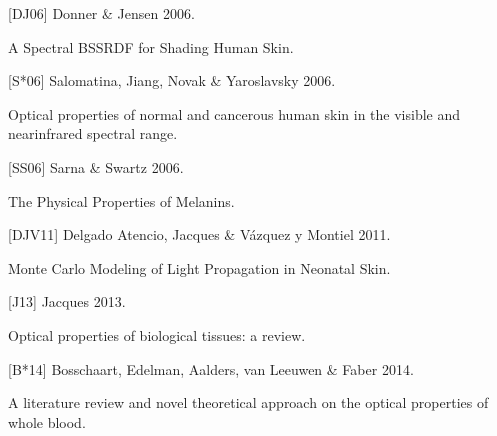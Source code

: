 \documentclass[letterpaper,10pt,english]{sphinxmanual}
\begin{document}
\begin{DUlineblock}{0em}
\item[] {[}DJ06{]} Donner \& Jensen 2006.
\item[] A Spectral BSSRDF for Shading Human Skin.
\item[] 
\end{DUlineblock}

\begin{DUlineblock}{0em}
\item[] {[}S*06{]} Salomatina, Jiang, Novak \& Yaroslavsky 2006.
\item[] Optical properties of normal and cancerous human skin in the visible and near\sphinxhyphen{}infrared spectral range.
\item[] 
\end{DUlineblock}

\begin{DUlineblock}{0em}
\item[] {[}SS06{]} Sarna \& Swartz 2006.
\item[] The Physical Properties of Melanins.
\item[] 
\end{DUlineblock}

\begin{DUlineblock}{0em}
\item[] {[}DJV11{]} Delgado Atencio, Jacques \& Vázquez y Montiel 2011.
\item[] Monte Carlo Modeling of Light Propagation in Neonatal Skin.
\item[] 
\end{DUlineblock}

\begin{DUlineblock}{0em}
\item[] {[}J13{]} Jacques 2013.
\item[] Optical properties of biological tissues: a review.
\item[] 
\end{DUlineblock}

\begin{DUlineblock}{0em}
\item[] {[}B*14{]} Bosschaart, Edelman, Aalders, van Leeuwen \& Faber 2014.
\item[] A literature review and novel theoretical approach on the optical properties of whole blood.
\item[] 
\end{DUlineblock}
\end{document}
